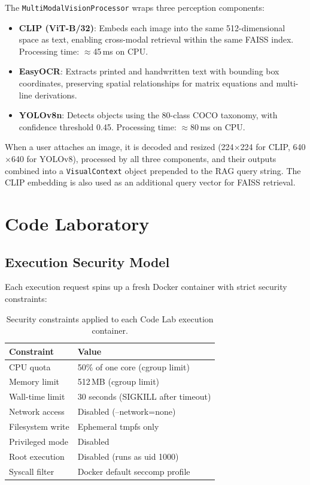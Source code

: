 The \texttt{MultiModalVisionProcessor} wraps three perception components:

\begin{itemize}
    \item \textbf{CLIP (ViT-B/32)}: Embeds each image into the same 512-dimensional space as text, enabling cross-modal retrieval within the same FAISS index. Processing time: $\approx$45\,ms on CPU.
    \item \textbf{EasyOCR}: Extracts printed and handwritten text with bounding box coordinates, preserving spatial relationships for matrix equations and multi-line derivations.
    \item \textbf{YOLOv8n}: Detects objects using the 80-class COCO taxonomy, with confidence threshold 0.45. Processing time: $\approx$80\,ms on CPU.
\end{itemize}

When a user attaches an image, it is decoded and resized (224$\times$224 for CLIP, 640$\times$640 for YOLOv8), processed by all three components, and their outputs combined into a \texttt{VisualContext} object prepended to the RAG query string. The CLIP embedding is also used as an additional query vector for FAISS retrieval.

\section{Code Laboratory}
\label{sec:codelab}

\subsection{Execution Security Model}
\label{subsec:security-model}

Each execution request spins up a fresh Docker container with strict security constraints:

\begin{table}[ht]
    \centering
    \caption{Security constraints applied to each Code Lab execution container.}
    \label{tab:sandbox-security}
    \renewcommand{\arraystretch}{1.3}
    \begin{tabular}{ll}
        \toprule
        \textbf{Constraint} & \textbf{Value} \\
        \midrule
        CPU quota           & 50\% of one core (cgroup limit) \\
        Memory limit        & 512\,MB (cgroup limit) \\
        Wall-time limit     & 30 seconds (SIGKILL after timeout) \\
        Network access      & Disabled (--network=none) \\
        Filesystem write    & Ephemeral tmpfs only \\
        Privileged mode     & Disabled \\
        Root execution      & Disabled (runs as uid 1000) \\
        Syscall filter      & Docker default seccomp profile \\
        \bottomrule
    \end{tabular}
\end{table}

